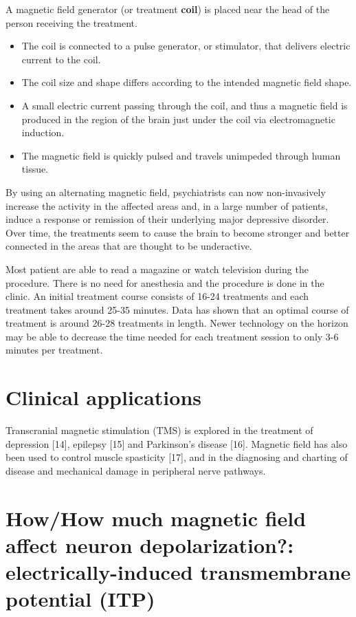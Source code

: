 A magnetic field generator (or treatment {\bf coil}) 
is placed near the head of the person receiving the treatment.
\begin{itemize}
  \item  The coil is connected to a pulse generator, or stimulator, that
  delivers electric current to the coil.

  \item The coil size and shape differs according to the intended magnetic field
  shape.
  
  \item  A small electric current passing through the coil, and thus a
  magnetic field is produced in the region of the brain just under the coil via
  electromagnetic induction.
  
  \item The magnetic field is quickly pulsed and travels unimpeded through human
  tissue.
  
\end{itemize}

By using an alternating magnetic field, psychiatrists can now non-invasively
increase the activity in the affected areas and, in a large number of patients,
induce a response or remission of their underlying major depressive disorder.
Over time, the treatments seem to cause the brain to become stronger and better
connected in the areas that are thought to be underactive.

Most patient are able to read a magazine or watch television during the
procedure. There is no need for anesthesia and the procedure is done in the
clinic. An initial treatment course consists of 16-24 treatments and each
treatment takes around 25-35 minutes. Data has shown that an optimal course of
treatment is around 26-28 treatments in length. Newer technology on the horizon
may be able to decrease the time needed for each treatment session to only 3-6
minutes per treatment.

\section{Clinical applications}

Transcranial magnetic stimulation (TMS) is explored in the treatment of
depression [14], epilepsy [15] and Parkinson's disease [16]. Magnetic field has
also been used to control muscle spasticity [17], and in the diagnosing and
charting of disease and mechanical damage in peripheral nerve pathways.


\section{How/How much magnetic field affect neuron depolarization?:
electrically-induced transmembrane potential (ITP)}
\label{sec:magnetic-field-neuron-depolarization}

